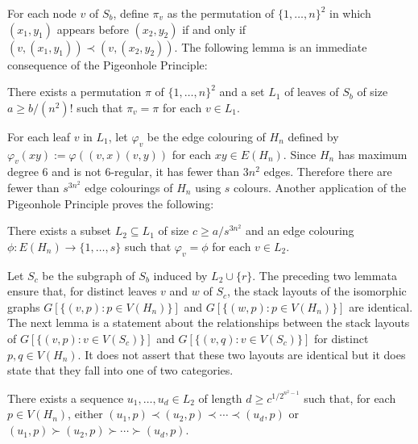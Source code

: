 \documentclass[kpfonts]{patmorin}
\renewcommand{\ge}{\geqslant}
\begin{document}
For each node $v$ of $S_b$, define $\pi_v$ as the permutation of $\{1,\ldots,n\}^2$ in which $(x_1,y_1)$ appears before $(x_2,y_2)$ if and only if $(v,(x_1,y_1))\prec (v,(x_2,y_2))$. The following lemma is an immediate consequence of the Pigeonhole Principle:

\begin{lem}\label{uniform_order}
    There exists a permutation $\pi$ of $\{1,\ldots,n\}^2$ and a set $L_1$ of leaves of $S_b$ of size $a\ge b/(n^2)!$ such that $\pi_{v}=\pi$ for each $v\in L_1$.
\end{lem}


For each leaf $v$ in $L_1$, let $\varphi_v$ be the edge colouring of $H_n$ defined by $\varphi_v(xy):=\varphi((v,x)(v,y))$ for each $xy\in E(H_n)$. Since $H_n$ has maximum degree $6$ and is not 6-regular, it has fewer than $3n^2$ edges.  Therefore there are fewer than $s^{3n^2}$ edge colourings of $H_n$ using $s$ colours.  Another application of the Pigeonhole Principle proves the following:

\begin{lem}\label{uniform_colour}
    There exists a subset $L_2\subseteq L_1$ of size $c\ge a/s^{3n^2}$
    and an edge colouring $\phi:E(H_n)\to\{1,\ldots,s\}$ such that $\varphi_v=\phi$ for each $v\in L_2$.
\end{lem}


Let $S_{c}$ be the subgraph of $S_b$ induced by $L_2\cup\{r\}$. The preceding two lemmata ensure that, for distinct leaves $v$ and $w$ of $S_{c}$, the stack layouts of the isomorphic graphs $G[\{(v,p):p\in V(H_n)\}]$ and $G[\{(w,p):p\in V(H_n)\}]$ are identical. The next lemma is a statement about the relationships between the stack layouts of $G[\{(v,p):v\in V(S_{c})\}]$ and $G[\{(v,q):v\in V(S_{c})\}]$ for  distinct $p,q\in V(H_n)$.  It does not assert that these two layouts are identical but it does state that they fall into one of two categories.

\begin{lem}\label{forward_or_backward}
    There exists a sequence $u_1,\ldots,u_{d}\in L_2$ of length $d\ge c^{1/2^{n^2-1}}$ such that, for each $p\in V(H_n)$, either  $(u_1,p)\prec (u_2,p)\prec\cdots\prec (u_{d},p)$ or $(u_1,p)\succ (u_2,p)\succ\cdots\succ (u_{d},p)$.
\end{lem}
\end{document}
